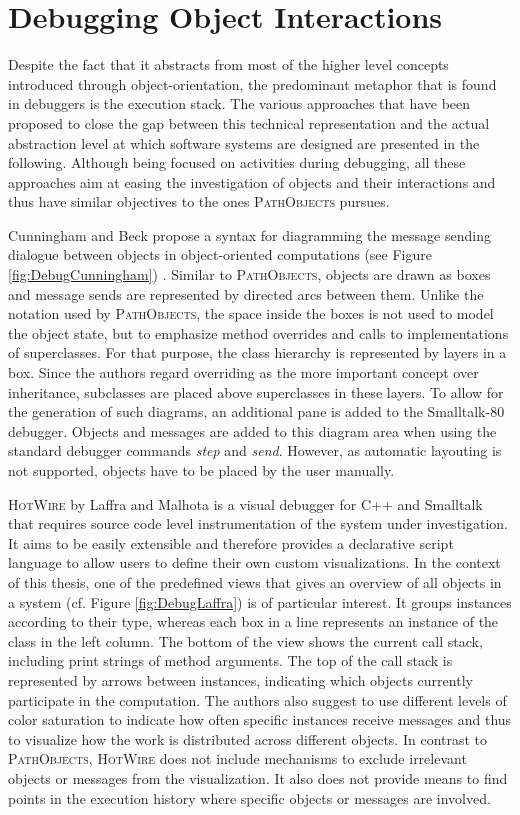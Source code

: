 \section{Debugging Object Interactions}
\label{s:RelatedDebugging}
Despite the fact that it abstracts from most of the higher level concepts introduced through object-orientation, the predominant metaphor that is found in debuggers is the execution stack.
The various approaches that have been proposed to close the gap between this technical representation and the actual abstraction level at which software systems are designed are presented in the following.
Although being focused on activities during debugging, all these approaches aim at easing the investigation of objects and their interactions and thus have similar objectives to the ones \textsc{PathObjects} pursues.

Cunningham and Beck propose a syntax for diagramming the message sending dialogue between objects in object-oriented computations (see Figure \ref{fig:DebugCunningham}) \cite{cunningham_diagram_1986}.
Similar to \textsc{PathObjects}, objects are drawn as boxes and message sends are represented by directed arcs between them.
Unlike the notation used by \textsc{PathObjects}, the space inside the boxes is not used to model the object state, but to emphasize method overrides and calls to implementations of superclasses.
For that purpose, the class hierarchy is represented by layers in a box.
Since the authors regard overriding as the more important concept over inheritance, subclasses are placed above superclasses in these layers. 
To allow for the generation of such diagrams, an additional pane is added to the Smalltalk-80 debugger. 
Objects and messages are added to this diagram area when using the standard debugger commands \emph{step} and \emph{send}. 
However, as automatic layouting is not supported, objects have to be placed by the user manually.

\textsc{HotWire} by Laffra and Malhota \cite{laffra_hotwire:_1994} is a visual debugger for C++ and Smalltalk that requires source code level instrumentation of the system under investigation.
It aims to be easily extensible and therefore provides a declarative script language to allow users to define their own custom visualizations.
In the context of this thesis, one of the predefined views that gives an overview of all objects in a system (cf. Figure \ref{fig:DebugLaffra}) is of particular interest.
It groups instances according to their type, whereas each box in a line represents an instance of the class in the left column.
The bottom of the view shows the current call stack, including print strings of method arguments.
The top of the call stack is represented by arrows between instances, indicating which objects currently participate in the computation.
The authors also suggest to use different levels of color saturation to indicate how often specific instances receive messages and thus to visualize how the work is distributed across different objects.
In contrast to \textsc{PathObjects}, \textsc{HotWire} does not include mechanisms to exclude irrelevant objects or messages from the visualization.
It also does not provide means to find points in the execution history where specific objects or messages are involved.

